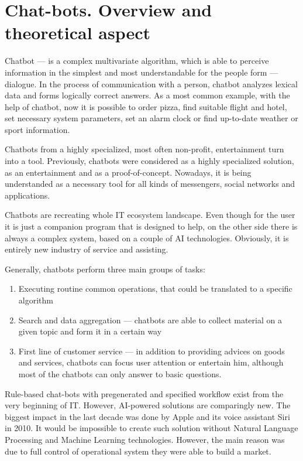 
\section{Chat-bots. Overview and theoretical aspect}

Chatbot — is a complex multivariate algorithm, which is able to perceive information in the simplest and most understandable for the people form — dialogue.
In the process of communication with a person, chatbot analyzes lexical data and forms logically correct answers.
As a most common example, with the help of chatbot, now it is possible to order pizza, find suitable flight and hotel, set necessary system parameters, set an alarm clock or find up-to-date weather or sport information.

Chatbots from a highly specialized, most often non-profit, entertainment turn into a tool.
Previously, chatbots were considered as a highly specialized solution, as an entertainment and as a proof-of-concept.
Nowadays, it is being understanded as a necessary tool for all kinds of messengers, social networks and applications.

Chatbots are recreating whole IT ecosystem landscape.
Even though for the user it is just a companion program that is designed to help, on the other side there is always a complex system, based on a couple of AI technologies.
Obviously, it is entirely new industry of service and assisting.

Generally, chatbots perform three main groups of tasks:
\begin{enumerate}
    \item Executing routine common operations, that could be translated to a specific algorithm
    \item Search and data aggregation — chatbots are able to collect material on a given topic and form it in a certain way
    \item First line of customer service — in addition to providing advices on goods and services, chatbots can focus user attention or entertain him, although most of the chatbots can only answer to basic questions.
\end{enumerate}

Rule-based chat-bots with pregenerated and specified workflow exist from the very beginning of IT.
However, AI-powered solutions are comparingly new.
The biggest impact in the last decade was done by Apple and its voice assistant Siri in 2010.
It would be impossible to create such solution without Natural Language Processing and Machine Learning technologies.
However, the main reason was due to full control of operational system they were able to build a market.

